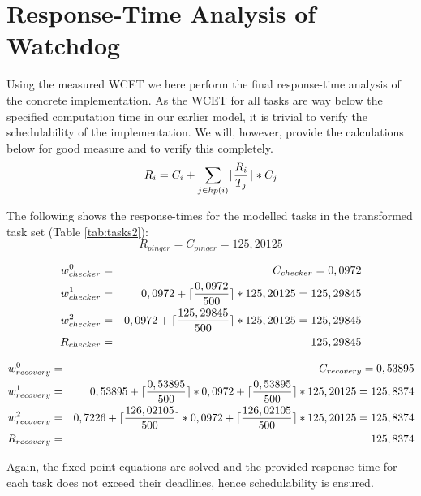 
\section{Response-Time Analysis of Watchdog} %
\label{sec:response_time_analysis_of_watchdog}
Using the measured WCET we here perform the final response-time analysis of the concrete implementation. As the WCET for all tasks are way below the specified computation time in our earlier model, it is trivial to verify the schedulability of the implementation. We will, however, provide the calculations below for good measure and to verify this completely.
\begin{equation}
\label{eq:rta}
     R_{i} = C_{i} + \sum\limits_{j\in hp(i)} \lceil\frac{R_{i}}{T_{j}}\rceil*C_{j}
\end{equation}

The following shows the response-times for the modelled tasks in the transformed task set (Table \ref{tab:tasks2}):
\begin{equation}
\label{eq:pingerrta}
     R_{pinger} = C_{pinger} = 125,20125
\end{equation}

\begin{eqnarray}
    w_{checker}^0 &=& C_{checker} = 0,0972 \nonumber \\ 
    w_{checker}^1 &=& 0,0972 + \lceil\frac{0,0972}{500}\rceil*125,20125 = 125,29845 \nonumber \\ 
    w_{checker}^2 &=& 0,0972 + \lceil\frac{125,29845}{500}\rceil*125,20125 = 125,29845 \nonumber \\
    R_{checker} &=& 125,29845
\end{eqnarray}

\begin{eqnarray}
    w_{recovery}^0 &=& C_{recovery} = 0,53895 \nonumber \\ 
    w_{recovery}^1 &=& 0,53895 + \lceil\frac{0,53895}{500}\rceil*0,0972 + \lceil\frac{0,53895}{500}\rceil*125,20125 = 125,8374 \nonumber \\ 
    w_{recovery}^2 &=& 0,7226 + \lceil\frac{126,02105}{500}\rceil*0,0972 + \lceil\frac{126,02105}{500}\rceil*125,20125 = 125,8374 \nonumber \\
    R_{recovery} &=& 125,8374
\end{eqnarray}

Again, the fixed-point equations are solved and the provided response-time for each task does not exceed their deadlines, hence schedulability is ensured.


